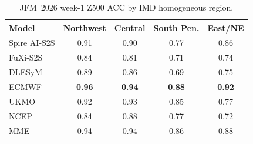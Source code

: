 \begin{table}[t]
  \centering
  \caption{JFM~2026 week-1 Z500 ACC by IMD homogeneous region.}
  \label{tab:reg_jfm_z500_w1}
  \small
  \begin{tabular}{lcccc}
    \toprule
    Model & Northwest & Central & South Pen. & East/NE \\
    \midrule
    Spire AI-S2S   & 0.91 & 0.90 & 0.77 & 0.86 \\
FuXi-S2S       & 0.84 & 0.81 & 0.71 & 0.74 \\
DLESyM         & 0.89 & 0.86 & 0.69 & 0.75 \\
ECMWF          & \textbf{0.96} & \textbf{0.94} & \textbf{0.88} & \textbf{0.92} \\
UKMO           & 0.92 & 0.93 & 0.85 & 0.77 \\
NCEP           & 0.84 & 0.88 & 0.77 & 0.72 \\
MME            & 0.94 & 0.94 & 0.86 & 0.88 \\
    \bottomrule
  \end{tabular}
\end{table}
